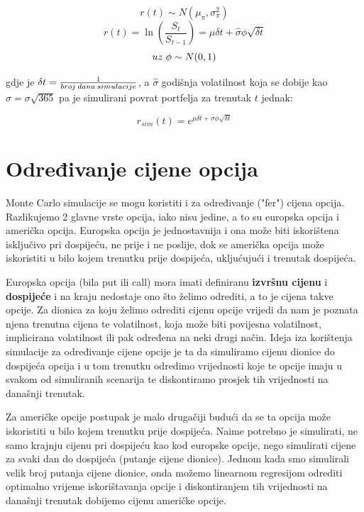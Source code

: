 \documentclass[times, utf8, seminar]{fer}
\begin{document}
\[ r(t) \sim N(\mu_{\pi}, \sigma_{\pi}^2)\]
\[ r(t) = \ln(\frac{S_{t}}{S_{t-1}}) = \mu\delta t + \hat{\sigma}\phi\sqrt{\delta t}\]
\[ uz \hspace{0.1cm} \phi \sim N(0,1) \]


\noindent gdje je $\delta t = \frac{1}{broj \hspace{0.07cm} dana \hspace{0.07cm} simulacije}$, a $\hat{\sigma}$ godišnja volatilnost koja se dobije kao $\hat{\sigma} = \sigma\sqrt{365}$ pa je simulirani povrat portfelja za trenutak $t$ jednak:

\[ r_{sim}(t) = e^{\mu\delta t + \sigma\phi\sqrt{\delta t}} \]

\section{Određivanje cijene opcija}
Monte Carlo simulacije se mogu koristiti i za određivanje ("fer") cijena opcija. Razlikujemo 2 glavne vrste opcija, iako nisu jedine, a to su europska opcija i američka opcija. Europska opcija je jednostavnija i ona može biti iskorištena  isključivo pri dospijeću, ne prije i ne poslije, dok se američka opcija može iskoristiti u bilo kojem trenutku prije dospijeća, ukljućujući i trenutak dospijeća.

Europska opcija (bila put ili call) mora imati definiranu \textbf{izvršnu cijenu} i \textbf{dospijeće} i na kraju nedostaje ono što želimo odrediti, a to je cijena takve opcije. Za dionica za koju želimo odrediti cijenu opcije vrijedi da nam je poznata njena trenutna cijena te volatilnost, koja može biti povijesna volatilnost, implicirana volatilnost ili pak određena na neki drugi način. Ideja iza korištenja simulacije za određivanje cijene opcije je ta da simuliramo cijenu dionice do dospijeća opcija i u tom trenutku odredimo vrijednosti koje te opcije imaju u svakom od simuliranih scenarija te diskontiramo prosjek tih vrijednosti na današnji trenutak.

Za američke opcije postupak je malo drugačiji budući da se ta opcija može iskoristiti u bilo kojem trenutku prije dospijeća. Naime potrebno je simulirati, ne samo krajnju cijenu pri dospijeću kao kod europske opcije, nego simulirati cijene za svaki dan do dospijeća (putanje cijene dionice). Jednom kada smo simulirali velik broj putanja cijene dionice, onda možemo linearnom regresijom odrediti optimalno vrijeme iskorištavanja opcije i diskontiranjem tih vrijednosti na današnji trenutak dobijemo cijenu američke opcije.
\end{document}
